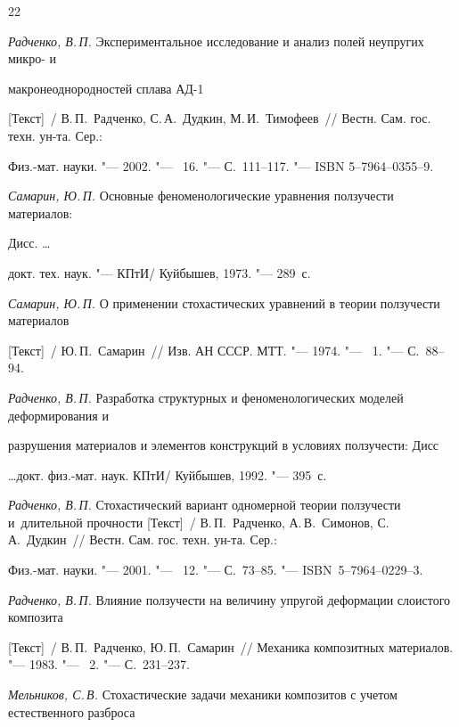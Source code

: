 \begin{thebibliography}{22}
\item \textit{Радченко, В.\,П.} Экспериментальное исследование и анализ полей неупругих микро- и 

макронеоднородностей сплава АД-1 

[Текст]~/ В.\,П.~Радченко, С.\,А.~Дудкин, М.\,И.~Тимофеев~/\!/ Вестн. Сам. гос. техн. ун-та. Сер.: 

Физ.-мат. науки. "--- 2002. "--- \No~16. "---  С.~111--117. "--- ISBN 5--7964--0355--9.



\item \textit{Самарин, Ю.\,П.} Основные феноменологические уравнения ползучести материалов:

Дисс. \ldots 

докт. тех. наук. "---  КПтИ/ Куйбышев, 1973. "---  289~с.



\item \textit{Самарин, Ю.\,П.} О применении стохастических уравнений в теории ползучести материалов

[Текст]~/ Ю.\,П.~Самарин~/\!/  Изв. АН СССР. МТТ. "---  1974. "--- \No~1. "---  С.~88--94.



\item \textit{Радченко, В.\,П.} Разработка структурных и феноменологических моделей деформирования и 

разрушения материалов и элементов конструкций в условиях ползучести: Дисс 

\ldots докт. физ.-мат. наук. КПтИ/ Куйбышев, 1992. "---  395~с.



\item \textit{Радченко, В.\,П.} Стохастический вариант одномерной теории ползучести и~длительной прочности [Текст]~/ В.\,П.~Радченко, А.\,В.~Симонов, С.\,А.~Дудкин~/\!/ Вестн. Сам. гос. техн. ун-та. Сер.: 

Физ.-мат. науки. "--- 2001. "--- \No~12. "---  С.~73--85. "---  ISBN~5--7964--0229--3.



\item \textit{Радченко, В.\,П.} Влияние ползучести на величину упругой деформации слоистого композита 

[Текст]~/ В.\,П.~Радченко, Ю.\,П.~Самарин~/\!/ Механика композитных материалов. "---  1983. "--- \No~2. "---  С.~231--237.



\item \textit{Мельников, С.\,В.} Стохастические задачи механики композитов с учетом естественного разброса 


\end{thebibliography}
